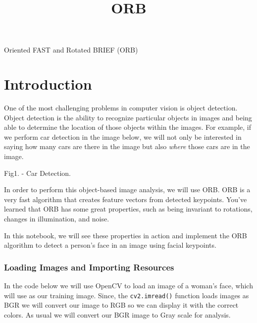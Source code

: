 \documentclass[11pt]{article}
\title{ORB}
\begin{document}
    
    
    \maketitle
    
    

    
     Oriented FAST and Rotated BRIEF (ORB)

\hypertarget{introduction}{%
\section{Introduction}\label{introduction}}

One of the most challenging problems in computer vision is object
detection. Object detection is the ability to recognize particular
objects in images and being able to determine the location of those
objects within the images. For example, if we perform car detection in
the image below, we will not only be interested in saying how many cars
are there in the image but also \emph{where} those cars are in the
image.

Fig1. - Car Detection.

 In order to perform this object-based image analysis, we will use ORB.
ORB is a very fast algorithm that creates feature vectors from detected
keypoints. You've learned that ORB has some great properties, such as
being invariant to rotations, changes in illumination, and noise.

In this notebook, we will see these properties in action and implement
the ORB algorithm to detect a person's face in an image using facial
keypoints.

    \hypertarget{loading-images-and-importing-resources}{%
\subsubsection{Loading Images and Importing
Resources}\label{loading-images-and-importing-resources}}

In the code below we will use OpenCV to load an image of a woman's face,
which will use as our training image. Since, the \texttt{cv2.imread()}
function loads images as BGR we will convert our image to RGB so we can
display it with the correct colors. As usual we will convert our BGR
image to Gray scale for analysis.
\end{document}
